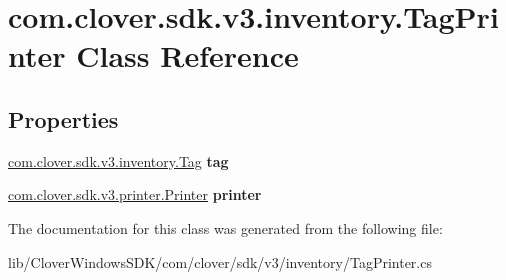 \hypertarget{classcom_1_1clover_1_1sdk_1_1v3_1_1inventory_1_1_tag_printer}{}\section{com.\+clover.\+sdk.\+v3.\+inventory.\+Tag\+Printer Class Reference}
\label{classcom_1_1clover_1_1sdk_1_1v3_1_1inventory_1_1_tag_printer}
\subsection*{Properties}
\begin{DoxyCompactItemize}
\item 
\mbox{\label{classcom_1_1clover_1_1sdk_1_1v3_1_1inventory_1_1_tag_printer_a3c80d9bcbf1b3a00b273b5567561397f}} 
\hyperlink{classcom_1_1clover_1_1sdk_1_1v3_1_1inventory_1_1_tag}{com.\+clover.\+sdk.\+v3.\+inventory.\+Tag} {\bfseries tag}
\item 
\mbox{\label{classcom_1_1clover_1_1sdk_1_1v3_1_1inventory_1_1_tag_printer_abb74a7f3b4959d74db14ae651ecc70bd}} 
\hyperlink{classcom_1_1clover_1_1sdk_1_1v3_1_1printer_1_1_printer}{com.\+clover.\+sdk.\+v3.\+printer.\+Printer} {\bfseries printer}
\end{DoxyCompactItemize}


The documentation for this class was generated from the following file\+:\begin{DoxyCompactItemize}
\item 
lib/\+Clover\+Windows\+S\+D\+K/com/clover/sdk/v3/inventory/Tag\+Printer.\+cs\end{DoxyCompactItemize}
